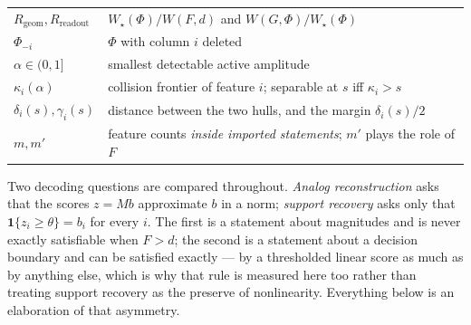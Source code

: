 \begin{table}[t]
\begin{tabular}{ll}
$R_{\mathrm{geom}},R_{\mathrm{readout}}$ & $W_{\star}(\Phi)/W(F,d)$ and $W(G,\Phi)/W_{\star}(\Phi)$ \\
$\Phi_{-i}$ & $\Phi$ with column $i$ deleted \\
$\alpha\in(0,1]$ & smallest detectable active amplitude \\
$\kappa_i(\alpha)$ & collision frontier of feature $i$; separable at $s$ iff $\kappa_i>s$ \\
$\delta_i(s),\gamma_i(s)$ & distance between the two hulls, and the margin $\delta_i(s)/2$ \\
$m,m'$ & feature counts \emph{inside imported statements}; $m'$ plays the role of $F$ \\
\bottomrule
\end{tabular}
\end{table}

Two decoding questions are compared throughout. \emph{Analog reconstruction} asks that the
scores $z=Mb$ approximate $b$ in a norm; \emph{support recovery} asks only that
$\mathbf 1\{z_i\ge\theta\}=b_i$ for every $i$. The first is a statement about magnitudes and is
never exactly satisfiable when $F>d$; the second is a statement about a decision boundary and
can be satisfied exactly --- by a thresholded linear score as much as by anything else, which
is why that rule is measured here too rather than treating support recovery as the preserve of
nonlinearity. Everything below is an elaboration of that asymmetry.

